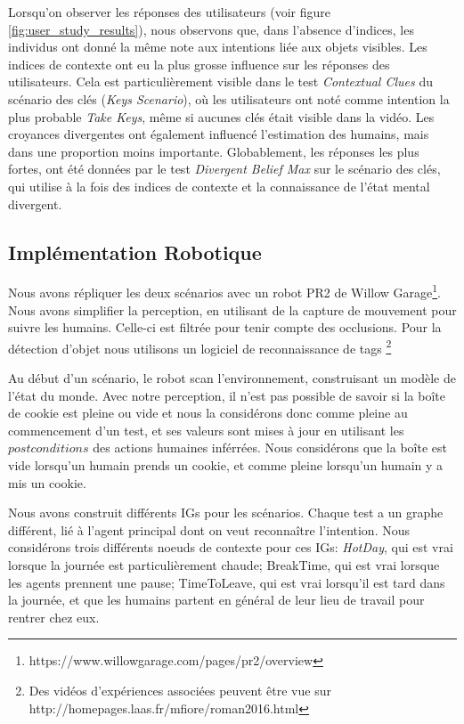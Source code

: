 \documentclass[a4paper,11pt,twoside]{StyleThese}
\begin{document}
Lorsqu'on observer les réponses des utilisateurs (voir figure \ref{fig:user_study_results}), nous observons que, dans l'absence d'indices, les individus ont donné la même note aux intentions liée aux objets visibles. Les indices de contexte ont eu la plus grosse influence sur les réponses des utilisateurs. Cela est particulièrement visible dans le test \textit{Contextual Clues} du scénario des clés (\textit{Keys Scenario}), où les utilisateurs ont noté comme intention la plus probable \textit{Take Keys}, même si aucunes clés était visible dans la vidéo. Les croyances divergentes ont également influencé l'estimation des humains, mais dans une proportion moins importante. Globablement, les réponses les plus fortes, ont été données par le test \textit{Divergent Belief Max} sur le scénario des clés, qui utilise à la fois des indices de contexte et la connaissance de l'état mental divergent.

\subsection{Implémentation Robotique}
Nous avons répliquer les deux scénarios avec un robot PR2 de Willow Garage\footnote{https://www.willowgarage.com/pages/pr2/overview}. Nous avons simplifier la perception, en utilisant de la capture de mouvement pour suivre les humains. Celle-ci est filtrée pour tenir compte des occlusions. Pour la détection d'objet nous utilisons un logiciel de reconnaissance de tags \footnote{Des vidéos d'expériences associées peuvent être vue sur  http://homepages.laas.fr/mfiore/roman2016.html} 

Au début d'un scénario, le robot scan l'environnement, construisant un modèle de l'état du monde. Avec notre perception, il n'est pas possible de savoir si la boîte de cookie est pleine ou vide et nous la considérons donc comme pleine au commencement d'un test, et ses valeurs sont mises à jour en utilisant les $postconditions$ des actions humaines inférrées. Nous considérons que la boîte est vide lorsqu'un humain prends un cookie, et comme pleine lorsqu'un humain y a mis un cookie.

Nous avons construit différents IGs pour les scénarios. Chaque test a un graphe différent, lié à l'agent principal dont on veut reconnaître l'intention. Nous considérons trois différents noeuds de contexte pour ces IGs: \textit{HotDay}, qui est vrai lorsque la journée est particulièrement chaude; BreakTime, qui est vrai lorsque les agents prennent une pause; TimeToLeave, qui est vrai lorsqu'il est tard dans la journée, et que les humains partent en général de leur lieu de travail pour rentrer chez eux.
\end{document}
